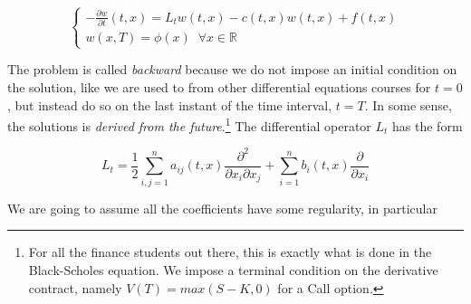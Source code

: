 \begin{equation}
    \begin{cases}
        -\frac{\partial w}{\partial t}(t,x) = L_t w(t,x) - c(t,x) w(t,x) + f(t,x) \\
        w(x,T) = \phi(x) \;\; \forall x \in \mathbb{R}
    \end{cases}
\end{equation}

The problem is called \textit{backward} because we do not impose an initial condition on the solution, like we are used to from other differential equations courses for $t = 0$, but instead do so on the last instant of the time interval, $t = T$. In some sense, the solutions is \textit{derived from the future}.\footnote{For all the finance students out there, this is exactly what is done in the Black-Scholes equation. We impose a terminal condition on the derivative contract, namely $V(T) = max(S-K,0)$ for a Call option.} The differential operator $L_t$ has the form

\begin{equation}
    L_t = \frac{1}{2} \sum_{i,j=1}^n a_{ij}(t,x) \frac{\partial^2}{\partial x_i \partial x_j} + \sum_{i=1}^n b_i(t,x) \frac{\partial}{\partial x_i}
\end{equation}

We are going to assume all the coefficients have some regularity, in particular

